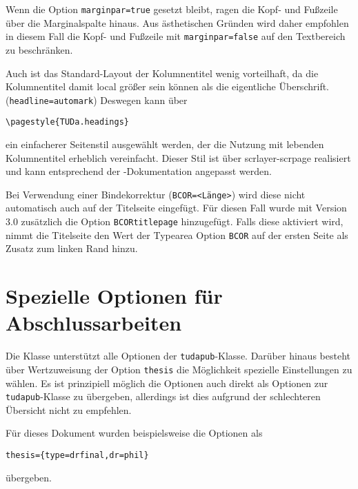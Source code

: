 \documentclass[
	german,%
	ruledheaders=section,%
	class=report,%
	thesis={type=bachelor},%
	accentcolor=9c,%
	custommargins=true,%
	marginpar=false,%
	parskip=half-,%
	fontsize=11pt,%
]{tudapub}
\let\file\texttt
\let\code\texttt
\let\pck\textsf
\begin{document}
Wenn die Option \code{marginpar=true} gesetzt bleibt, ragen die Kopf- und Fußzeile über die Marginalspalte hinaus. Aus ästhetischen Gründen wird daher empfohlen in diesem Fall die Kopf- und Fußzeile  mit \code{marginpar=false}  auf den Textbereich zu beschränken.

Auch ist das Standard-Layout der Kolumnentitel wenig vorteilhaft, da die Kolumnentitel damit local größer sein können als die eigentliche Überschrift. (\code{headline=automark})
Deswegen kann über
\begin{verbatim}
\pagestyle{TUDa.headings}
\end{verbatim}
ein einfacherer Seitenstil ausgewählt werden, der die Nutzung mit lebenden Kolumnentitel erheblich vereinfacht. Dieser Stil ist über \pck{scrlayer-scrpage} realisiert und kann entsprechend der \KOMAScript{}-Dokumentation angepasst werden.

Bei Verwendung einer Bindekorrektur (\code{BCOR=<Länge>}) wird diese nicht automatisch auch auf der Titelseite eingefügt. Für diesen Fall wurde mit Version 3.0 zusätzlich die Option \code{BCORtitlepage} hinzugefügt. Falls diese aktiviert wird, nimmt die Titelseite den Wert der Typearea Option \code{BCOR} auf der ersten Seite als Zusatz zum linken Rand hinzu.

\section{Spezielle Optionen für Abschlussarbeiten}
Die Klasse unterstützt alle Optionen der \file{tudapub}-Klasse. Darüber hinaus besteht über Wertzuweisung der Option \code{thesis} die Möglichkeit spezielle Einstellungen zu wählen.
Es ist prinzipiell möglich die Optionen auch direkt als Optionen zur \file{tudapub}-Klasse zu übergeben, allerdings ist dies aufgrund der schlechteren Übersicht nicht zu empfehlen.

Für dieses Dokument wurden beispielsweise die Optionen als
\begin{verbatim}
thesis={type=drfinal,dr=phil}
\end{verbatim}
übergeben.
\end{document}
